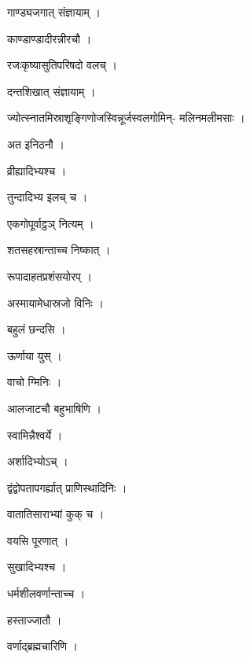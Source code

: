 \documentclass[10pt, openany]{book}
\begin{document}
\noindent गाण्ड्यजगात् संज्ञायाम् ।

\noindent काण्डाण्डादीरन्नीरचौ ।

\noindent रजःकृष्यासुतिपरिषदो वलच् ।

\noindent दन्तशिखात् संज्ञायाम् ।

\noindent ज्योत्स्नातमिस्राश‍ृङ्गिणोजस्विन्नूर्जस्वलगोमिन्- मलिनमलीमसाः ।

\noindent अत इनिठनौ ।

\noindent व्रीह्यादिभ्यश्च ।

\noindent तुन्दादिभ्य इलच् च ।

\noindent एकगोपूर्वाट्ठञ् नित्यम् ।

\noindent शतसहस्रान्ताच्च निष्कात् ।

\noindent रूपादाहतप्रशंसयोरप् ।

\noindent अस्मायामेधास्रजो विनिः ।

\noindent बहुलं छन्दसि ।

\noindent ऊर्णाया युस् ।

\noindent वाचो ग्मिनिः ।

\noindent आलजाटचौ बहुभाषिणि ।

\noindent स्वामिन्नैश्वर्ये ।

\noindent अर्शादिभ्योऽच् ।

\noindent द्वंद्वोपतापगर्ह्यात् प्राणिस्थादिनिः ।

\noindent वातातिसाराभ्यां कुक् च ।

\noindent वयसि पूरणात् ।

\noindent सुखादिभ्यश्च ।

\noindent धर्मशीलवर्णान्ताच्च ।

\noindent हस्ताज्जातौ ।

\noindent वर्णाद्ब्रह्मचारिणि ।
\end{document}
